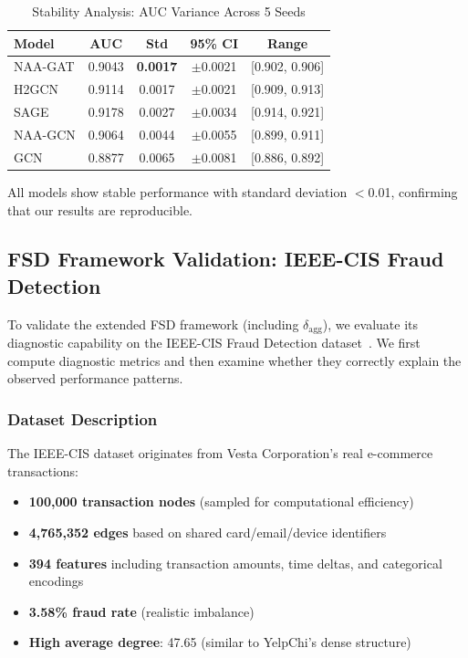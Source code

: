 \begin{table}[t]
\centering
\caption{Stability Analysis: AUC Variance Across 5 Seeds}
\label{tab:stability}
\small
\begin{tabular}{lcccc}
\toprule
\textbf{Model} & \textbf{AUC} & \textbf{Std} & \textbf{95\% CI} & \textbf{Range} \\
\midrule
NAA-GAT & 0.9043 & \textbf{0.0017} & $\pm$0.0021 & [0.902, 0.906] \\
H2GCN & 0.9114 & 0.0017 & $\pm$0.0021 & [0.909, 0.913] \\
SAGE & 0.9178 & 0.0027 & $\pm$0.0034 & [0.914, 0.921] \\
NAA-GCN & 0.9064 & 0.0044 & $\pm$0.0055 & [0.899, 0.911] \\
GCN & 0.8877 & 0.0065 & $\pm$0.0081 & [0.886, 0.892] \\
\bottomrule
\end{tabular}
\end{table}

All models show stable performance with standard deviation $<$0.01, confirming that our results are reproducible.

\subsection{FSD Framework Validation: IEEE-CIS Fraud Detection}
\label{sec:ieee_cis}

To validate the extended FSD framework (including $\delta_{\text{agg}}$), we evaluate its diagnostic capability on the IEEE-CIS Fraud Detection dataset~\cite{ieee_cis_kaggle}. We first compute diagnostic metrics and then examine whether they correctly explain the observed performance patterns.

\subsubsection{Dataset Description}

The IEEE-CIS dataset originates from Vesta Corporation's real e-commerce transactions:
\begin{itemize}
    \item \textbf{100,000 transaction nodes} (sampled for computational efficiency)
    \item \textbf{4,765,352 edges} based on shared card/email/device identifiers
    \item \textbf{394 features} including transaction amounts, time deltas, and categorical encodings
    \item \textbf{3.58\% fraud rate} (realistic imbalance)
    \item \textbf{High average degree}: 47.65 (similar to YelpChi's dense structure)
\end{itemize}


